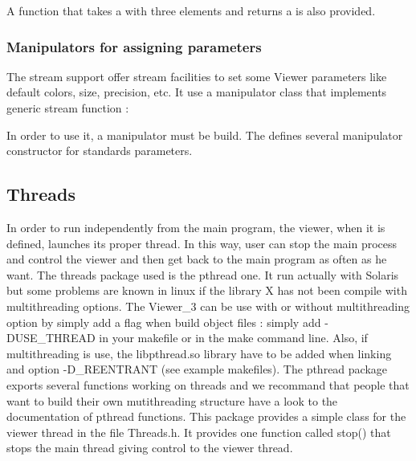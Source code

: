 A function that takes a  with three elements and
returns a  is also provided.

\subsubsection{Manipulators for assigning  parameters}

The stream support offer stream facilities to set some Viewer
parameters like default colors, size, precision, etc. It use a manipulator class  that implements
generic stream function :


In order to use it, a manipulator must be build. The
 defines several manipulator constructor for
standards parameters.

\ccGlue
\ccGlue
\ccGlue
{}
\ccGlue
{}



\subsection{Threads}

In order to run independently from the main program, the viewer, when
it is defined, launches its proper thread. In this way, user can stop
the main process and control the viewer and then get back to the main
program as often as he want. 
The threads package used is the pthread one. It run actually with
Solaris but some problems are known in linux if the library X has not 
been compile with multithreading options. The Viewer\_3 can be use with 
or without multithreading option by simply add a flag when build
object files : simply add -DUSE\_THREAD in your makefile or in the make 
command line. Also, if multithreading is use, the libpthread.so library
have to be added when linking and option -D\_REENTRANT (see example
makefiles).
The pthread package exports several functions working on threads and
we recommand that people that want to build their own mutithreading
structure have a look to the documentation of pthread functions. This
package provides a simple class for the viewer thread in the file
Threads.h. It provides one function called stop() that stops the main
thread giving control to the viewer thread.

